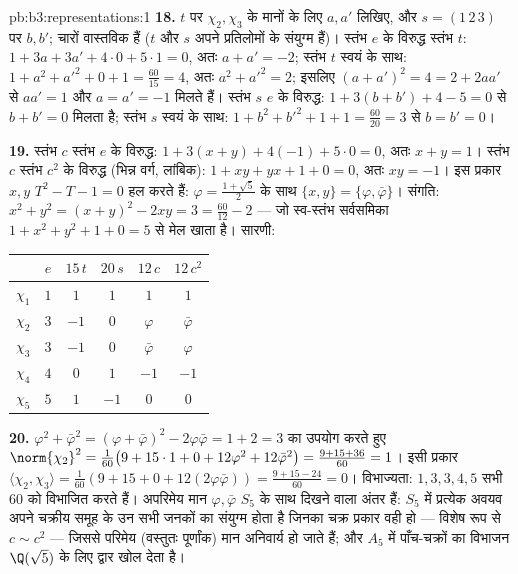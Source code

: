 \begin{solution}{pb:b3:representations:1}
\textbf{18.} $t$ पर $\chi_2, \chi_3$ के मानों के लिए $a, a'$ लिखिए, और $s = (1\,2\,3)$
पर $b, b'$; चारों वास्तविक हैं ($t$ और $s$ अपने प्रतिलोमों के
संयुग्म हैं)। स्तंभ $e$ के विरुद्ध स्तंभ $t$: $1 + 3a + 3a' + 4\cdot0 + 5\cdot1 = 0$, अतः $a + a'
= -2$;
स्तंभ $t$ स्वयं के साथ: $1 + a^2 + a'^2 + 0 + 1 =
\frac{60}{15} = 4$, अतः $a^2 + a'^2 = 2$; इसलिए $(a + a')^2 = 4
= 2 + 2aa'$ से $aa' = 1$
और $a = a' = -1$ मिलते हैं। स्तंभ $s$ $e$ के विरुद्ध: $1 + 3(b + b') + 4 - 5 = 0$ से $b + b' = 0$
मिलता है; स्तंभ $s$ स्वयं के साथ: $1 + b^2 + b'^2 + 1 + 1 = \frac{60}
{20} = 3$ से $b = b' = 0$।

\textbf{19.} स्तंभ $c$ स्तंभ $e$ के विरुद्ध: $1 + 3(x + y) +
4(-1) + 5\cdot0 = 0$, अतः $x + y = 1$।
स्तंभ $c$ स्तंभ $c^2$ के विरुद्ध (भिन्न वर्ग, लांबिक): $1 + xy + yx + 1
+ 0 = 0$, अतः
$xy = -1$। इस प्रकार $x, y$ $T^2 - T - 1 = 0$ हल करते हैं: $\varphi = \frac{1 +
\sqrt5}2$ के साथ $\{x, y\} = \{\varphi, \bar\varphi\}$। संगति:
$x^2 + y^2 = (x+y)^2 - 2xy = 3 =
\frac{60}{12} - 2$ --- जो स्व-स्तंभ सर्वसमिका $1 +
x^2 + y^2 + 1 + 0 = 5$ से मेल खाता है। सारणी:
\begin{center}
\begin{tabular}{c|ccccc}
 & $e$ & $15\,t$ & $20\,s$ & $12\,c$ & $12\,c^2$\\
\hline
$\chi_1$ & $1$ & $1$ & $1$ & $1$ & $1$\\
$\chi_2$ & $3$ & $-1$ & $0$ & $\varphi$ & $\bar\varphi$\\
$\chi_3$ & $3$ & $-1$ & $0$ & $\bar\varphi$ & $\varphi$\\
$\chi_4$ & $4$ & $0$ & $1$ & $-1$ & $-1$\\
$\chi_5$ & $5$ & $1$ & $-1$ & $0$ & $0$\\
\end{tabular}
\end{center}

\textbf{20.} $\varphi^2 + \bar\varphi^2 = (\varphi +
\bar\varphi)^2 - 2\varphi\bar\varphi = 1 + 2 = 3$ का उपयोग करते हुए $\norm{\chi_2}^2 = \frac1{60}\bigl(9 + 15\cdot1 +
0 + 12\varphi^2 + 12\bar\varphi^2\bigr) = \frac{9 + 15 +
36}{60} = 1$। इसी प्रकार $\langle\chi_2, \chi_3\rangle = \frac1{60}(9 + 15 + 0 +
12(2\varphi\bar\varphi)) = \frac{9 + 15 - 24}{60} = 0$।
 विभाज्यता: $1, 3, 3, 4, 5$ सभी $60$ को विभाजित करते हैं। अपरिमेय
मान $\varphi, \bar\varphi$ $S_5$ के साथ दिखने वाला अंतर हैं: $S_5$ में प्रत्येक अवयव
अपने चक्रीय समूह के उन सभी जनकों का संयुग्म होता है जिनका चक्र प्रकार
वही हो --- विशेष रूप से $c \sim c^2$ --- जिससे परिमेय (वस्तुतः पूर्णांक)
 मान अनिवार्य हो जाते हैं; और $A_5$ में पाँच-चक्रों का विभाजन
$\Q(\sqrt5)$ के लिए द्वार खोल देता है।


\end{solution}
